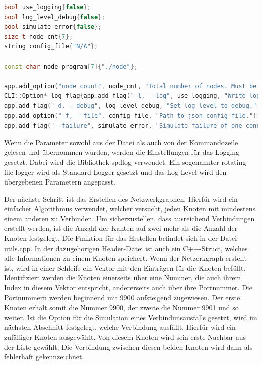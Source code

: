 \begin{minipage}{\linewidth}
\begin{lstlisting}[language={C++}, caption={Angabe der Kommandozeilenparameter}, label={lst:cmd_args}]
bool use_logging{false};
bool log_level_debug{false};
bool simulate_error{false};
size_t node_cnt{7};
string config_file{"N/A"};

const char node_program[7]{"./node"};

app.add_option("node count", node_cnt, "Total number of nodes. Must be > 0.")->check(CLI::PositiveNumber);
CLI::Option* log_flag{app.add_flag("-l, --log", use_logging, "Write log file dist_sync_log.log.")};
app.add_flag("-d, --debug", log_level_debug, "Set log level to debug.")->needs(log_flag);
app.add_option("-f, --file", config_file, "Path to json config file.")->check(CLI::ExistingFile);
app.add_flag("--failure", simulate_error, "Simulate failure of one connection");
\end{lstlisting}
\end{minipage}
Wenn die Parameter sowohl aus der Datei als auch von der Kommandozeile gelesen und übernommen wurden, werden die Einstellungen für das Logging gesetzt. Dabei wird die Bibliothek spdlog verwendet. Ein sogenannter rotating-file-logger wird als Standard-Logger gesetzt und das Log-Level wird den übergebenen Parametern angepasst.

Der nächste Schritt ist das Erstellen des Netzwerkgraphen. Hierfür wird ein einfacher Algorithmus verwendet, welcher versucht, jeden Knoten mit mindestens einem anderen zu Verbinden. Um sicherzustellen, dass ausreichend Verbindungen erstellt werden, ist die Anzahl der Kanten auf zwei mehr als die Anzahl der Knoten festgelegt. Die Funktion für das Erstellen befindet sich in der Datei utils.cpp. In der dazugehörigen Header-Datei ist auch ein C++-Struct, welches alle Informationen zu einem Knoten speichert. Wenn der Netzerkgraph erstellt ist, wird in einer Schleife ein Vektor mit den Einträgen für die Knoten befüllt. Identifiziert werden die Knoten einerseits über eine Nummer, die auch ihrem Index in diesem Vektor entspricht, andererseits auch über ihre Portnummer. Die Portnummern werden beginnend mit 9900 aufsteigend zugewiesen. Der erste Knoten erhält somit die Nummer 9900, der zweite die Nummer 9901 und so weiter. Ist die Option für die Simulation eines Verbindunsausfalls gesetzt, wird im nächsten Abschnitt festgelegt, welche Verbindung ausfällt. Hierfür wird ein zufälliger Knoten ausgewählt. Von diesem Knoten wird sein erste Nachbar aus der Liste gewählt. Die Verbindung zwischen diesen beiden Knoten wird dann als fehlerhaft gekennzeichnet.

